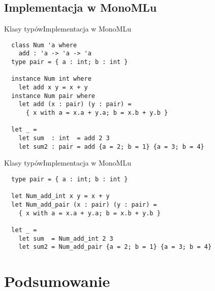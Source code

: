 \documentclass{beamer}
\begin{document}
\subsection{Implementacja w MonoMLu}

\begin{frame}[fragile]{Klasy typów}{Implementacja w MonoMLu}
\begin{center}
\begin{minipage}{1.0\textwidth}
\begin{verbatim}
  class Num 'a where 
    add : 'a -> 'a -> 'a
  type pair = { a : int; b : int }

  instance Num int where
    let add x y = x + y 
  instance Num pair where 
    let add (x : pair) (y : pair) = 
      { x with a = x.a + y.a; b = x.b + y.b }

  let _ = 
    let sum  : int  = add 2 3
    let sum2 : pair = add {a = 2; b = 1} {a = 3; b = 4}
\end{verbatim}
\end{minipage}
\end{center}
\end{frame}

\begin{frame}[fragile]{Klasy typów}{Implementacja w MonoMLu}
\begin{center}
\begin{minipage}{1.0\textwidth}
\begin{verbatim}
  type pair = { a : int; b : int }

  let Num_add_int x y = x + y 
  let Num_add_pair (x : pair) (y : pair) = 
    { x with a = x.a + y.a; b = x.b + y.b }

  let _ = 
    let sum  = Num_add_int 2 3
    let sum2 = Num_add_pair {a = 2; b = 1} {a = 3; b = 4}
\end{verbatim}
\end{minipage}
\end{center}
\end{frame}

\section*{Podsumowanie}
\end{document}
